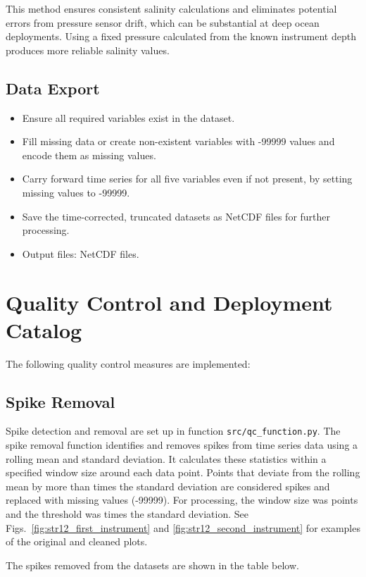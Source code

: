 This method ensures consistent salinity calculations and eliminates potential errors from pressure sensor drift, 
which can be substantial at deep ocean deployments. 
Using a fixed pressure calculated from the known instrument depth produces more reliable salinity values.

\subsection{Data Export}

\begin{itemize}
\item Ensure all required variables exist in the dataset.
\item Fill missing data or create non-existent variables with -99999 values and encode them as missing values.
\item Carry forward time series for all five variables even if not present, by setting missing values to -99999.
\item Save the time-corrected, truncated datasets as NetCDF files for further processing.
\item Output files: NetCDF files.
\end{itemize}

\section{Quality Control and Deployment Catalog}
The following quality control measures are implemented:

\subsection{Spike Removal}
Spike detection and removal are set up in function \texttt{src/qc\_function.py}. 
The spike removal function identifies and removes spikes from time series data using a rolling mean and standard deviation. 
It calculates these statistics within a specified window size around each data point. 
Points that deviate from the rolling mean by more than \ThresholdValue{} times the standard deviation are considered spikes and replaced with missing values (-99999). 
For \displayprojectname{} \casenumber{} processing, the window size was \WindowSize{} points and the threshold was \ThresholdValue{} times the standard deviation.
See Figs.~\ref{fig:str12_first_instrument} and \ref{fig:str12_second_instrument} for examples of the original and cleaned plots.

The spikes removed from the datasets are shown in the table below.

